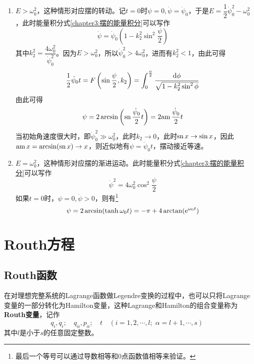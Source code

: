 \begin{enumerate}
\item $E>\omega_0^2$，这种情形对应摆的转动。记$t=0$时$\psi=0,\dot{\psi}=\dot{\psi}_0$，于是$E=\dfrac12\dot{\psi}_0^2-\omega_0^2$，此时能量积分式\eqref{chapter3:摆的能量积分}可以写作
\begin{equation}
	\dot{\psi} = \dot{\psi}_0\left(1-k_2^2\sin^2\dfrac{\psi}{2}\right)
\end{equation}
其中$k_2^2=\dfrac{4\omega_0^2}{\dot{\psi}_0^2}$。因为$E>\omega_0^2$，所以$\dot{\psi}_0^2>4\omega_0^2$，进而有$k_2^2<1$，由此可得
\begin{equation}
	\frac12 \dot{\psi}_0t=F\left(\sin\dfrac{\psi}{2},k_2\right) = \int_0^{\frac{\psi}{2}}\frac{\mathrm{d}\phi}{\sqrt{1-k_2^2\sin^2\phi}}
\end{equation}
由此可得
\begin{equation}
	\psi = 2\arcsin\left(\mathrm{sn}\,\dfrac{\dot{\psi}_0}{2}t\right) = 2\mathrm{am}\,\dfrac{\dot{\psi}_0}{2}t
\end{equation}
当初始角速度很大时，即$\dot{\psi}_0^2\gg\omega_0^2$，此时$k_2\to 0$，此时$\mathrm{sn}\, x\to \sin x$，因此$\mathrm{am}\, x=\arcsin (\mathrm{sn}\, x)\to x$，则近似地有$\psi=\dot{\psi}_0t$，摆动接近等速。

\item $E=\omega_0^2$，这种情形对应摆的渐进运动。此时能量积分式\eqref{chapter3:摆的能量积分}可以写作
\begin{equation}
	\dot{\psi}^2=4\omega_0^2\cos^2\frac{\psi}{2}
\end{equation}
如果$t=0$时，$\psi=0,\dot{\psi}>0$，则有\footnote{最后一个等号可以通过导数相等和$0$点函数值相等来验证。}
\begin{equation}
	\psi = 2\arcsin(\tanh \omega_0t) = -\pi+4\arctan(\mathrm{e}^{\omega_0t})
\end{equation}
\end{enumerate}

\section{Routh方程}

\subsection{Routh函数}

在对理想完整系统的Lagrange函数做Legendre变换的过程中，也可以只将Lagrange变量的一部分转化为Hamilton变量，这种Lagrange和Hamilton的组合变量称为{\bf Routh变量}，记作
\begin{equation*}
	q_i,\dot{q}_i;\quad q_\alpha,p_\alpha; \quad t\quad (i=1,2,\cdots,l;\,\,\alpha=l+1,\cdots,s)
\end{equation*}
其中$l$是小于$s$的任意固定整数。

